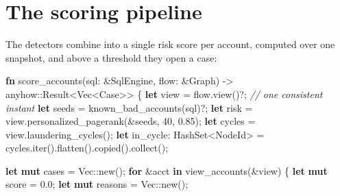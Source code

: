 \documentclass[
  11pt,
  openany]{book}
\newenvironment{Shaded}{}{}
\newcommand{\CommentTok}[1]{\textcolor[rgb]{0.38,0.63,0.69}{\textit{#1}}}
\newcommand{\ControlFlowTok}[1]{\textcolor[rgb]{0.00,0.44,0.13}{\textbf{#1}}}
\newcommand{\DataTypeTok}[1]{\textcolor[rgb]{0.56,0.13,0.00}{#1}}
\newcommand{\DecValTok}[1]{\textcolor[rgb]{0.25,0.63,0.44}{#1}}
\newcommand{\KeywordTok}[1]{\textcolor[rgb]{0.00,0.44,0.13}{\textbf{#1}}}
\newcommand{\NormalTok}[1]{#1}
\newcommand{\OperatorTok}[1]{\textcolor[rgb]{0.40,0.40,0.40}{#1}}
\newcommand{\PreprocessorTok}[1]{\textcolor[rgb]{0.74,0.48,0.00}{#1}}
\begin{document}
\section{The scoring pipeline}\label{the-scoring-pipeline}

The detectors combine into a single risk score per account, computed
over one snapshot, and above a threshold they open a case:

\begin{Shaded}
\begin{Highlighting}[]
\KeywordTok{fn}\NormalTok{ score\_accounts(sql}\OperatorTok{:} \OperatorTok{\&}\NormalTok{SqlEngine}\OperatorTok{,}\NormalTok{ flow}\OperatorTok{:} \OperatorTok{\&}\NormalTok{Graph) }\OperatorTok{{-}\textgreater{}} \PreprocessorTok{anyhow::}\DataTypeTok{Result}\OperatorTok{\textless{}}\DataTypeTok{Vec}\OperatorTok{\textless{}}\NormalTok{Case}\OperatorTok{\textgreater{}\textgreater{}} \OperatorTok{\{}
    \KeywordTok{let}\NormalTok{ view }\OperatorTok{=}\NormalTok{ flow}\OperatorTok{.}\NormalTok{view()}\OperatorTok{?;}                            \CommentTok{// one consistent instant}
    \KeywordTok{let}\NormalTok{ seeds }\OperatorTok{=}\NormalTok{ known\_bad\_accounts(sql)}\OperatorTok{?;}
    \KeywordTok{let}\NormalTok{ risk  }\OperatorTok{=}\NormalTok{ view}\OperatorTok{.}\NormalTok{personalized\_pagerank(}\OperatorTok{\&}\NormalTok{seeds}\OperatorTok{,} \DecValTok{40}\OperatorTok{,} \DecValTok{0.85}\NormalTok{)}\OperatorTok{;}
    \KeywordTok{let}\NormalTok{ cycles }\OperatorTok{=}\NormalTok{ view}\OperatorTok{.}\NormalTok{laundering\_cycles()}\OperatorTok{;}
    \KeywordTok{let}\NormalTok{ in\_cycle}\OperatorTok{:}\NormalTok{ HashSet}\OperatorTok{\textless{}}\NormalTok{NodeId}\OperatorTok{\textgreater{}} \OperatorTok{=}\NormalTok{ cycles}\OperatorTok{.}\NormalTok{iter()}\OperatorTok{.}\NormalTok{flatten()}\OperatorTok{.}\NormalTok{copied()}\OperatorTok{.}\NormalTok{collect()}\OperatorTok{;}

    \KeywordTok{let} \KeywordTok{mut}\NormalTok{ cases }\OperatorTok{=} \DataTypeTok{Vec}\PreprocessorTok{::}\NormalTok{new()}\OperatorTok{;}
    \ControlFlowTok{for} \OperatorTok{\&}\NormalTok{acct }\KeywordTok{in}\NormalTok{ view\_accounts(}\OperatorTok{\&}\NormalTok{view) }\OperatorTok{\{}
        \KeywordTok{let} \KeywordTok{mut}\NormalTok{ score }\OperatorTok{=} \DecValTok{0.0}\OperatorTok{;}
        \KeywordTok{let} \KeywordTok{mut}\NormalTok{ reasons }\OperatorTok{=} \DataTypeTok{Vec}\PreprocessorTok{::}\NormalTok{new()}\OperatorTok{;}


\end{Highlighting}
\end{Shaded}
\end{document}
